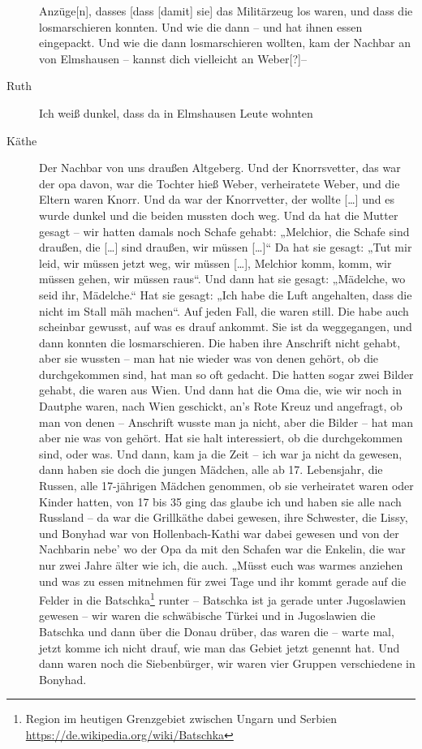 \documentclass[ngerman,]{article}
\begin{document}
\begin{multicols}{3}
\begin{description}
Anzüge{[}n{]}, dasses {[}dass {[}damit{]} sie{]} das Militärzeug los
waren, und dass die losmarschieren konnten. Und wie die dann – und hat
ihnen essen eingepackt. Und wie die dann losmarschieren wollten, kam der
Nachbar an von Elmshausen – kannst dich vielleicht an Weber{[}?{]}–
\item[Ruth]
Ich weiß dunkel, dass da in Elmshausen Leute wohnten
\item[Käthe]
Der Nachbar von uns draußen Altgeberg. Und der Knorrsvetter, das war der
opa davon, war die Tochter hieß Weber, verheiratete Weber, und die
Eltern waren Knorr. Und da war der Knorrvetter, der wollte
{[}\ldots{}{]} und es wurde dunkel und die beiden mussten doch weg. Und
da hat die Mutter gesagt – wir hatten damals noch Schafe gehabt:
„Melchior, die Schafe sind draußen, die {[}\ldots{}{]} sind draußen, wir
müssen {[}\ldots{}{]}“ Da hat sie gesagt: „Tut mir leid, wir müssen
jetzt weg, wir müssen {[}\ldots{}{]}, Melchior komm, komm, wir müssen
gehen, wir müssen raus“. Und dann hat sie gesagt: „Mädelche, wo seid
ihr, Mädelche.“ Hat sie gesagt: „Ich habe die Luft angehalten, dass die
nicht im Stall mäh machen“. Auf jeden Fall, die waren still. Die habe
auch scheinbar gewusst, auf was es drauf ankommt. Sie ist da
weggegangen, und dann konnten die losmarschieren. Die haben ihre
Anschrift nicht gehabt, aber sie wussten – man hat nie wieder was von
denen gehört, ob die durchgekommen sind, hat man so oft gedacht. Die
hatten sogar zwei Bilder gehabt, die waren aus Wien. Und dann hat die
Oma die, wie wir noch in Dautphe waren, nach Wien geschickt, an's Rote
Kreuz und angefragt, ob man von denen – Anschrift wusste man ja nicht,
aber die Bilder – hat man aber nie was von gehört. Hat sie halt
interessiert, ob die durchgekommen sind, oder was. Und dann, kam ja die
Zeit – ich war ja nicht da gewesen, dann haben sie doch die jungen
Mädchen, alle ab 17. Lebensjahr, die Russen, alle 17-jährigen Mädchen
genommen, ob sie verheiratet waren oder Kinder hatten, von 17 bis 35
ging das glaube ich und haben sie alle nach Russland – da war die
Grillkäthe dabei gewesen, ihre Schwester, die Lissy, und Bonyhad war von
Hollenbach-Kathi war dabei gewesen und von der Nachbarin nebe' wo der
Opa da mit den Schafen war die Enkelin, die war nur zwei Jahre älter wie
ich, die auch. „Müsst euch was warmes anziehen und was zu essen
mitnehmen für zwei Tage und ihr kommt gerade auf die Felder in die
Batschka\footnote{Region im heutigen Grenzgebiet zwischen Ungarn und
  Serbien \url{https://de.wikipedia.org/wiki/Batschka}} runter –
Batschka ist ja gerade unter Jugoslawien gewesen – wir waren die
schwäbische Türkei und in Jugoslawien die Batschka und dann über die
Donau drüber, das waren die – warte mal, jetzt komme ich nicht drauf,
wie man das Gebiet jetzt genennt hat. Und dann waren noch die
Siebenbürger, wir waren vier Gruppen verschiedene in Bonyhad.
\end{description}


\end{multicols}
\end{document}
